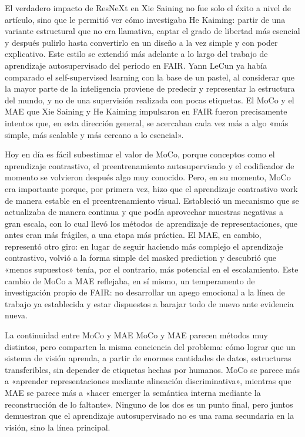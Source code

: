 El verdadero impacto de ResNeXt en Xie Saining no fue solo el éxito a nivel de artículo, sino que le permitió ver cómo investigaba He Kaiming: partir de una variante estructural que no era llamativa, captar el grado de libertad más esencial y después pulirlo hasta convertirlo en un diseño a la vez simple y con poder explicativo. Este estilo se extendió más adelante a lo largo del trabajo de aprendizaje autosupervisado del periodo en FAIR. Yann LeCun ya había comparado el self-supervised learning con la base de un pastel, al considerar que la mayor parte de la inteligencia proviene de predecir y representar la estructura del mundo, y no de una supervisión realizada con pocas etiquetas. El MoCo y el MAE que Xie Saining y He Kaiming impulsaron en FAIR fueron precisamente intentos que, en esta dirección general, se acercaban cada vez más a algo «más simple, más scalable y más cercano a lo esencial».

Hoy en día es fácil subestimar el valor de MoCo, porque conceptos como el aprendizaje contrastivo, el preentrenamiento autosupervisado y el codificador de momento se volvieron después algo muy conocido. Pero, en su momento, MoCo era importante porque, por primera vez, hizo que el aprendizaje contrastivo work de manera estable en el preentrenamiento visual. Estableció un mecanismo que se actualizaba de manera continua y que podía aprovechar muestras negativas a gran escala, con lo cual llevó los métodos de aprendizaje de representaciones, que antes eran más frágiles, a una etapa más práctica. El MAE, en cambio, representó otro giro: en lugar de seguir haciendo más complejo el aprendizaje contrastivo, volvió a la forma simple del masked prediction y descubrió que «menos supuestos» tenía, por el contrario, más potencial en el escalamiento. Este cambio de MoCo a MAE reflejaba, en sí mismo, un temperamento de investigación propio de FAIR: no desarrollar un apego emocional a la línea de trabajo ya establecida y estar dispuestos a barajar todo de nuevo ante evidencia nueva.

\begin{knowledgebox}{La continuidad entre MoCo y MAE}
MoCo y MAE parecen métodos muy distintos, pero comparten la misma conciencia del problema: cómo lograr que un sistema de visión aprenda, a partir de enormes cantidades de datos, estructuras transferibles, sin depender de etiquetas hechas por humanos. MoCo se parece más a «aprender representaciones mediante alineación discriminativa», mientras que MAE se parece más a «hacer emerger la semántica interna mediante la reconstrucción de lo faltante». Ninguno de los dos es un punto final, pero juntos demuestran que el aprendizaje autosupervisado no es una rama secundaria en la visión, sino la línea principal.
\end{knowledgebox}

